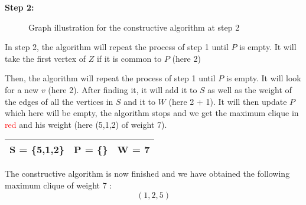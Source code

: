     \vspace{1\baselineskip}

    \begin{minipage}{\linewidth}
        \textbf{Step 2:} \newline
        \begin{minipage}{0.4\textwidth}
            \begin{figure}[H]
                \centering
                \caption{Graph illustration for the constructive algorithm at step 2}
                \label{fig:constructive-mewc-edge-step2}
            \end{figure}
        \end{minipage}
        \begin{minipage}{0.6\textwidth}
            In step 2, the algorithm will repeat the process of step 1 until $P$ is empty. It will take the first vertex of $Z$ if it is common to $P$ (here 2)

            Then, the algorithm will repeat the process of step 1 until $P$ is empty. It will look for a new $v$ (here 2). After finding it, it will add it to $S$ as well as the weight of the edges of all the vertices in $S$ and it to $W$ (here 2 + 1). It will then update $P$ which here will be empty, the algorithm stops and we get the maximum clique in \textcolor{red}{red} and his weight (here (5,1,2) of weight 7).
    
            \begin{center}
                \begin{tabular}{|lll|}
                    \hline
                    S = \{5,1,2\} & P = \{\} & W = 7 \\
                    \hline
                \end{tabular}
            \end{center}
        \end{minipage}
    \end{minipage}

    \vspace{1\baselineskip}

    The constructive algorithm is now finished and we have obtained the following maximum clique of weight 7 : $$(1,2,5)$$

\newpage

